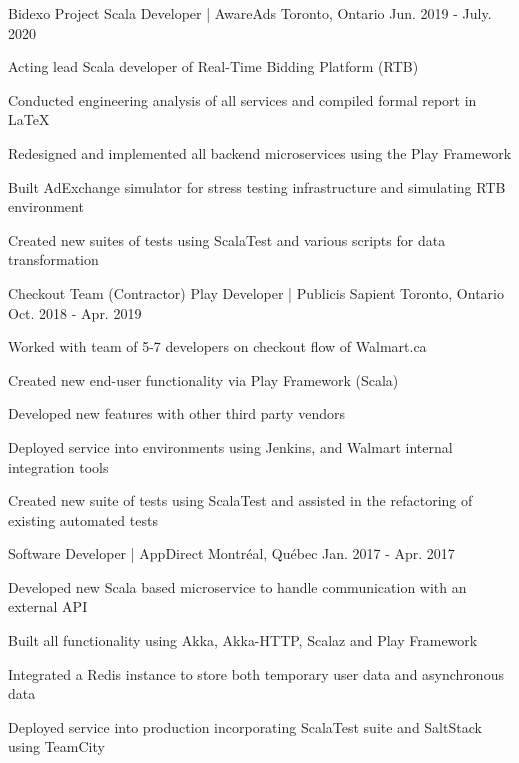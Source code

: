 \begin{cventries}
\cventry
    {Bidexo Project}
    {Scala Developer | AwareAds}
    {Toronto, Ontario}
    {Jun. 2019 - July. 2020}
    {
      \begin{cvitems}
        \item {Acting lead Scala developer of Real-Time Bidding Platform (RTB)}
        \item {Conducted engineering analysis of all services and compiled formal report in \LaTeX}
        \item {Redesigned and implemented all backend microservices using the Play Framework}
        \item {Built AdExchange simulator for stress testing infrastructure and simulating RTB environment}
        \item {Created new suites of tests using ScalaTest and various scripts for data transformation}
      \end{cvitems}
    }
\cventry
    {Checkout Team}
    {(Contractor) Play Developer | Publicis Sapient}
    {Toronto, Ontario}
    {Oct. 2018 - Apr. 2019}
    {
      \begin{cvitems}
        \item {Worked with team of 5-7 developers on checkout flow of Walmart.ca}
        \item {Created new end-user functionality via Play Framework (Scala) }
        \item {Developed new features with other third party vendors}
        \item {Deployed service into environments using Jenkins, and Walmart internal integration tools}
        \item {Created new suite of tests using ScalaTest and assisted in the refactoring of existing automated tests}
      \end{cvitems}
    }
    {\vspace{-3mm}Software Developer | AppDirect}
    {Montréal, Québec}
    {Jan. 2017 - Apr. 2017 }
    {
      \begin{cvitems}
        \item {Developed new Scala based microservice to handle communication with an external API}
        \item {Built all functionality using Akka, Akka-HTTP, Scalaz and Play Framework}
        \item {Integrated a Redis instance to store both temporary user data and asynchronous data}
        \item {Deployed service into production incorporating ScalaTest suite and SaltStack using TeamCity}

\end{cvitems}}
\end{cventries}
